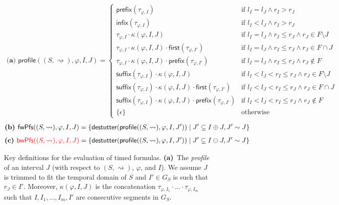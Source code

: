 \documentclass[iicol,lineno]{sn-jnl}
\renewcommand{\pfx}{\textsf{prefix}}
\newcommand{\first}{\textsf{first}}
\renewcommand{\sfx}{\textsf{suffix}}
\newcommand{\infx}{\textsf{infix}}
\newcommand{\hb}{\rightsquigarrow}
\newcommand{\destutter}{\mathsf{destutter}}
\newcommand{\?}{\text{?}}
\newcommand{\suchthat}{\;\ifnum\currentgrouptype=16 \middle\fi|\;}
\let\st\suchthat
\begin{document}
	\begin{figure}[!t]
		\begin{align*}
			\textbf{(a) }
			\mathsf{profile}((S,{\hb}), \varphi, I, J) =
			\begin{cases}
				\pfx(\tau_{\varphi,I}) & \text{if } l_I = l_J \land r_I > r_J \\
				\infx(\tau_{\varphi,I}) & \text{if } l_I < l_J \land r_I > r_J \\
				\tau_{\varphi,I} \cdot \kappa(\varphi, I, J) & \text{if } l_I = l_J \land r_I \leq r_J \land r_J \in F \setminus J \\
				\tau_{\varphi,I} \cdot \kappa(\varphi, I, J) \cdot \first(\tau_{\varphi,I'}) & \text{if } l_I = l_J \land r_I \leq r_J \land r_J \in F \cap J  \\		
				\tau_{\varphi,I} \cdot \kappa(\varphi, I, J) \cdot \pfx(\tau_{\varphi,I'}) & \text{if } l_I = l_J \land r_I \leq r_J \land r_J \notin F  \\
				\sfx(\tau_{\varphi,I}) \cdot \kappa(\varphi, I, J) & \text{if }  l_I < l_J < r_I \leq r_J \land r_J \in F \setminus J  \\
				\sfx(\tau_{\varphi,I}) \cdot \kappa(\varphi, I, J) \cdot \first(\tau_{\varphi,I'}) & \text{if } l_I < l_J < r_I \leq r_J \land r_J \in F \cap J \\
				\sfx(\tau_{\varphi,I}) \cdot \kappa(\varphi, I, J) \cdot \pfx(\tau_{\varphi,I'}) & \text{if } l_I < l_J < r_I \leq r_J \land r_J \notin F \\
				\{\epsilon\} & \text{otherwise}
			\end{cases}
		\end{align*}
		\begin{align*}
			\textbf{(b) }
			\mathsf{fwPfs}((S,{\hb}), \varphi, I, J) = \{\destutter(\mathsf{profile}((S,{\hb}), \varphi, I, J')) \st J' \subseteq I \oplus J, J' \sim J\}
		\end{align*}
		\begin{align*}
			\textbf{(c) }
			\bgroup \color{red} \mathsf{bwPfs}((S,{\hb}), \varphi, I, J) \egroup = \{\destutter(\mathsf{profile}((S,{\hb}), \varphi, I, J')) \st J' \subseteq I \ominus J, J' \sim J\}
		\end{align*}
		\caption{Key definitions for the evaluation of timed formulas.
			\textbf{(a)}~The \emph{profile} of an interval $J$ (with respect to $(S,{\hb})$, $\varphi$, and $I$).
			We assume $J$ is trimmed to fit the temporal domain of $S$ and $I' \in G_S$ is such that $r_J \in I'$.
			Moreover, $\kappa(\varphi, I, J)$ is the concatenation $\tau_{\varphi,I_1} \cdot \ldots \cdot \tau_{\varphi,I_m}$ such that $I, I_1, \ldots, I_m, I'$ are consecutive segments in $G_S$.
}
\end{figure}
\end{document}
